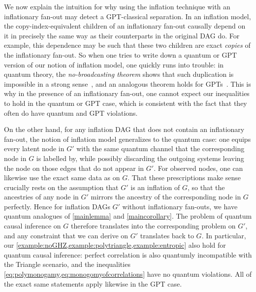 {We now explain the intuition for why using the inflation technique with an inflationary fan-out may detect a GPT-classical separation. In an inflation model, the copy-index-equivalent children of an inflationary fan-out causally depend on it in precisely the same way as their counterparts in the original DAG do. For example, this dependence may be such that these two children are exact \emph{copies} of the inflationary fan-out. So when one tries to write down a quantum or GPT version of our notion of inflation model, one quickly runs into trouble: in quantum theory, the {\em no-broadcasting theorem} shows that such duplication is impossible in a strong sense~\cite{NoCloningQuantum1996}, and an analogous theorem holds for GPTs~\cite{NoCloningGeneral2006}. This is why in the presence of an inflationary fan-out, one cannot expect our inequalities to hold in the quantum or GPT case, which is consistent with the fact that they often do have quantum and GPT violations.

On the other hand, for any inflation DAG that does not contain an inflationary fan-out, the notion of inflation model generalizes to the quantum case: one equips every latent node in $G'$ with the same quantum channel that the corresponding node in $G$ is labelled by, while possibly discarding the outgoing systems leaving the node on those edges that do not appear in $G'$. For observed nodes, one can likewise use the exact same data as on $G$. That these prescriptions make sense crucially rests on the assumption that $G'$ is an inflation of $G$, so that the ancestries of any node in $G'$ mirrors the ancestry of the corresponding node in $G$ perfectly. Hence for inflation DAGs $G'$ without inflationary fan-outs, we have quantum analogues of \cref{mainlemma} and \cref{maincorollary}. The problem of quantum causal inference on $G$ therefore translates into the corresponding problem on $G'$, and any constraint that we can derive on $G'$ translates back to $G$. In particular, our \cref{example:noGHZ,example:polytriangle,example:entropic} also hold for quantum causal inference: perfect correlation is also quantumly incompatible with the Triangle scenario, and the inequalities \cref{eq:polymonogamy,eq:monogomyofcorrelations} have no quantum violations. All of the exact same statements apply likewise in the GPT case.

}
